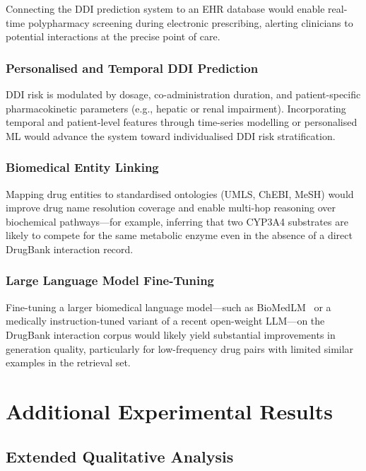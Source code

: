 \documentclass[12pt,a4paper,oneside]{report}
\begin{document}
Connecting the DDI prediction system to an EHR database would enable real-time polypharmacy
screening during electronic prescribing, alerting clinicians to potential interactions at
the precise point of care.

\subsection{Personalised and Temporal DDI Prediction}

DDI risk is modulated by dosage, co-administration duration, and patient-specific
pharmacokinetic parameters (e.g., hepatic or renal impairment). Incorporating temporal
and patient-level features through time-series modelling or personalised ML would advance
the system toward individualised DDI risk stratification.

\subsection{Biomedical Entity Linking}

Mapping drug entities to standardised ontologies (UMLS, ChEBI, MeSH) would improve drug
name resolution coverage and enable multi-hop reasoning over biochemical pathways---for
example, inferring that two CYP3A4 substrates are likely to compete for the same metabolic
enzyme even in the absence of a direct DrugBank interaction record.

\subsection{Large Language Model Fine-Tuning}

Fine-tuning a larger biomedical language model---such as BioMedLM~\cite{bolton2022pubmedgpt}
or a medically instruction-tuned variant of a recent open-weight LLM---on the DrugBank
interaction corpus would likely yield substantial improvements in generation quality,
particularly for low-frequency drug pairs with limited similar examples in the retrieval set.

\appendix

\chapter{Additional Experimental Results}

\section{Extended Qualitative Analysis}
\end{document}
